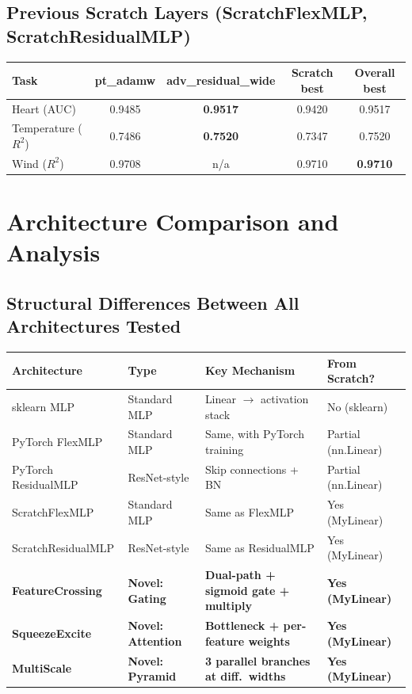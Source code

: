 \documentclass[11pt,a4paper]{article}
\begin{document}
\subsection{Previous Scratch Layers (ScratchFlexMLP, ScratchResidualMLP)}

\begin{center}
\small
\begin{tabular}{lcccc}
\toprule
\textbf{Task} & \textbf{pt\_adamw} & \textbf{adv\_residual\_wide} & \textbf{Scratch best} & \textbf{Overall best} \\
\midrule
Heart (AUC) & 0.9485 & \textbf{0.9517} & 0.9420 & 0.9517 \\
Temperature ($R^2$) & 0.7486 & \textbf{0.7520} & 0.7347 & 0.7520 \\
Wind ($R^2$) & 0.9708 & n/a & 0.9710 & \textbf{0.9710} \\
\bottomrule
\end{tabular}
\end{center}

\section{Architecture Comparison and Analysis}

\subsection{Structural Differences Between All Architectures Tested}

\begin{center}
\small
\begin{tabular}{p{3cm}p{2.5cm}p{4cm}p{3.5cm}}
\toprule
\textbf{Architecture} & \textbf{Type} & \textbf{Key Mechanism} & \textbf{From Scratch?} \\
\midrule
sklearn MLP & Standard MLP & Linear $\to$ activation stack & No (sklearn) \\
PyTorch FlexMLP & Standard MLP & Same, with PyTorch training & Partial (nn.Linear) \\
PyTorch ResidualMLP & ResNet-style & Skip connections + BN & Partial (nn.Linear) \\
ScratchFlexMLP & Standard MLP & Same as FlexMLP & Yes (MyLinear) \\
ScratchResidualMLP & ResNet-style & Same as ResidualMLP & Yes (MyLinear) \\
\midrule
\textbf{FeatureCrossing} & \textbf{Novel: Gating} & \textbf{Dual-path + sigmoid gate + multiply} & \textbf{Yes (MyLinear)} \\
\textbf{SqueezeExcite} & \textbf{Novel: Attention} & \textbf{Bottleneck + per-feature weights} & \textbf{Yes (MyLinear)} \\
\textbf{MultiScale} & \textbf{Novel: Pyramid} & \textbf{3 parallel branches at diff.\ widths} & \textbf{Yes (MyLinear)} \\
\bottomrule
\end{tabular}
\end{center}
\end{document}

